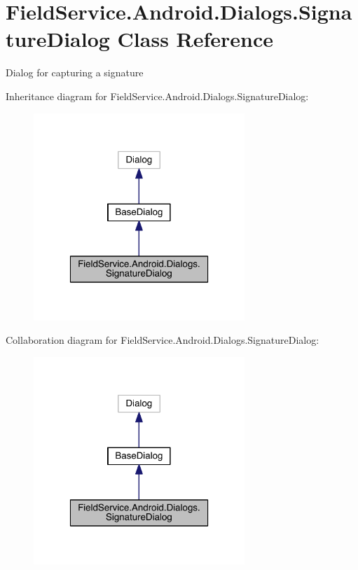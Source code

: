 \hypertarget{class_field_service_1_1_android_1_1_dialogs_1_1_signature_dialog}{\section{Field\+Service.\+Android.\+Dialogs.\+Signature\+Dialog Class Reference}
\label{class_field_service_1_1_android_1_1_dialogs_1_1_signature_dialog}
}


Dialog for capturing a signature  




Inheritance diagram for Field\+Service.\+Android.\+Dialogs.\+Signature\+Dialog\+:
\nopagebreak
\begin{figure}[H]
\begin{center}
\leavevmode
\includegraphics[width=226pt]{class_field_service_1_1_android_1_1_dialogs_1_1_signature_dialog__inherit__graph}
\end{center}
\end{figure}


Collaboration diagram for Field\+Service.\+Android.\+Dialogs.\+Signature\+Dialog\+:
\nopagebreak
\begin{figure}[H]
\begin{center}
\leavevmode
\includegraphics[width=226pt]{class_field_service_1_1_android_1_1_dialogs_1_1_signature_dialog__coll__graph}
\end{center}
\end{figure}
